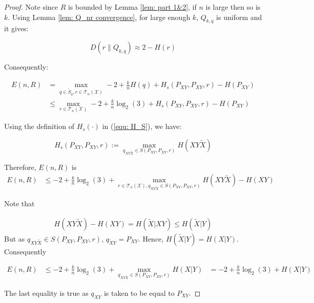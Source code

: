\begin{proof}
Note since $R$ is bounded by Lemma \ref{lem: part 1&2}, if $n$ is large then so is $k$. Using Lemma \ref{lem: Q_nr convergence}, for large enough $k$, $Q_{k,q}$ is uniform and it gives:

\begin{equation*}
D(r\| Q_{k,q}) \approx 2-H(r)
\end{equation*}

Consequently:

\begin{align*}
E(n,R)&= \max_{q\in \tilde{S}_q, r\in\mathcal{T}_n(\mathcal{X})} -2+\frac{k}{n} H(q)+H_s(P_{XY},P_{XY},r)-H(P_{XY})\\
&\leq\max_{ r\in\mathcal{T}_n(\mathcal{X})} -2+\frac{k}{n} \log_2(3)+H_s(P_{XY},P_{XY},r)-H(P_{XY})
\end{align*}

Using the definition of $H_s(\cdot)$ in (\ref{equ: H_S}), we have:

\begin{equation*}
H_{s}(P_{XY},P_{XY},r):= \max_{q_{XY\tilde{X}}\in S(P_{XY},P_{XY},r)} H(XY\tilde{X})
\end{equation*}

Therefore, $E(n,R)$ is
\begin{align*}
E(n,R)&\leq -2+\frac{k}{n} \log_2(3)+\max_{ r\in\mathcal{T}_n(\mathcal{X}), q_{XY\tilde{X}}\in S(P_{XY},P_{XY},r)} H(XY\tilde{X})-H(XY)
\end{align*}

Note that

\begin{align*}
H(XY\tilde{X})-H(XY)=H(\tilde{X}|XY)\leq H(\tilde{X}|Y)
\end{align*}
But as $q_{XY\tilde{X}}\in S(P_{XY},P_{XY},r)$, $q_{\tilde{X}Y}=P_{XY}$. Hence, $H(\tilde{X}|Y)=H(X|Y)$. Consequently

\begin{align*}
E(n,R)&\leq -2+\frac{k}{n} \log_2(3)+\max_{ q_{XY\tilde{X}}\in S(P_{XY},P_{XY},r)} H(X|Y)
&=-2+\frac{k}{n} \log_2(3)+H(X|Y)
\end{align*}

The last equality is true as $q_{XY}$ is taken to be equal to $P_{XY}$. 



\end{proof}
